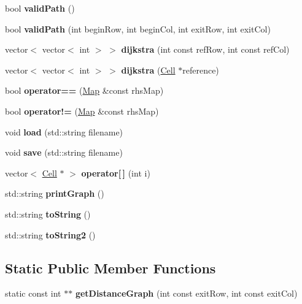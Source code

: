 \begin{DoxyCompactItemize}
bool {\bfseries valid\+Path} ()
\item 
\hypertarget{class_map_a6749a0b9a270aef552af6bd94f88e7bc}{}\label{class_map_a6749a0b9a270aef552af6bd94f88e7bc} 
bool {\bfseries valid\+Path} (int begin\+Row, int begin\+Col, int exit\+Row, int exit\+Col)
\item 
\hypertarget{class_map_a51aac90778c2a06c43ff151fe42e0a2a}{}\label{class_map_a51aac90778c2a06c43ff151fe42e0a2a} 
vector$<$ vector$<$ int $>$ $>$ {\bfseries dijkstra} (int const ref\+Row, int const ref\+Col)
\item 
\hypertarget{class_map_a92525f41812b35f69ddb6b2e6bc28e13}{}\label{class_map_a92525f41812b35f69ddb6b2e6bc28e13} 
vector$<$ vector$<$ int $>$ $>$ {\bfseries dijkstra} (\hyperlink{class_cell}{Cell} $\ast$reference)
\item 
\hypertarget{class_map_a76ba15e9f73cfdf657e00720744b4466}{}\label{class_map_a76ba15e9f73cfdf657e00720744b4466} 
bool {\bfseries operator==} (\hyperlink{class_map}{Map} \&const rhs\+Map)
\item 
\hypertarget{class_map_a13a2dfbee73ab704f06d9a6cf153beb6}{}\label{class_map_a13a2dfbee73ab704f06d9a6cf153beb6} 
bool {\bfseries operator!=} (\hyperlink{class_map}{Map} \&const rhs\+Map)
\item 
\hypertarget{class_map_af7b0ff0228286f88cd6b6a2b87604004}{}\label{class_map_af7b0ff0228286f88cd6b6a2b87604004} 
void {\bfseries load} (std\+::string filename)
\item 
\hypertarget{class_map_a0b67e2b03238fd18ecab89d8369ca67b}{}\label{class_map_a0b67e2b03238fd18ecab89d8369ca67b} 
void {\bfseries save} (std\+::string filename)
\item 
\hypertarget{class_map_a8f2e95c92c3b1b36d9212b101d755bd8}{}\label{class_map_a8f2e95c92c3b1b36d9212b101d755bd8} 
vector$<$ \hyperlink{class_cell}{Cell} $\ast$ $>$ {\bfseries operator\mbox{[}$\,$\mbox{]}} (int i)
\item 
\hypertarget{class_map_ad90ace533d344806630a886a6c7eea05}{}\label{class_map_ad90ace533d344806630a886a6c7eea05} 
std\+::string {\bfseries print\+Graph} ()
\item 
\hypertarget{class_map_a94c656e72ab63c3791c1f8522f56f603}{}\label{class_map_a94c656e72ab63c3791c1f8522f56f603} 
std\+::string {\bfseries to\+String} ()
\item 
\hypertarget{class_map_a0574d5f4543eb879d8f736ec696c6376}{}\label{class_map_a0574d5f4543eb879d8f736ec696c6376} 
std\+::string {\bfseries to\+String2} ()
\end{DoxyCompactItemize}
\subsection*{Static Public Member Functions}
\begin{DoxyCompactItemize}
\item 
\hypertarget{class_map_a5862ce4a3b20cb267fc19d4167aa3f05}{}\label{class_map_a5862ce4a3b20cb267fc19d4167aa3f05} 
static const int $\ast$$\ast$ {\bfseries get\+Distance\+Graph} (int const exit\+Row, int const exit\+Col)
\end{DoxyCompactItemize}
